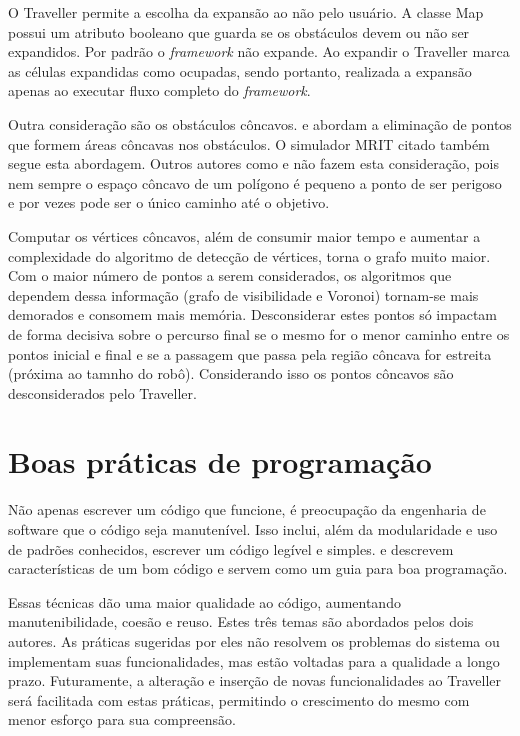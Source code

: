O Traveller permite a escolha da expansão ao não pelo usuário. A classe Map possui um atributo booleano que guarda se os obstáculos devem ou não ser expandidos. Por padrão o \textit{framework} não expande. Ao expandir o Traveller marca as células expandidas como ocupadas, sendo portanto, realizada a expansão apenas ao executar fluxo completo do \textit{framework}.

Outra consideração são os obstáculos côncavos. \cite{Siegwart2004} e \cite{Guzman2008} abordam a eliminação de pontos que formem áreas côncavas nos obstáculos. O simulador MRIT citado também segue esta abordagem. Outros autores como \cite{Thomsen2010} e \cite{Choset2005} não fazem esta consideração, pois nem sempre o espaço côncavo de um polígono é pequeno a ponto de ser perigoso e por vezes pode ser o único caminho até o objetivo. 

Computar os vértices côncavos, além de consumir maior tempo e aumentar a complexidade do algoritmo de detecção de vértices, torna o grafo muito maior. Com o maior número de pontos a serem considerados, os algoritmos que dependem dessa informação (grafo de visibilidade e Voronoi) tornam-se mais demorados e consomem mais memória. Desconsiderar estes pontos só impactam de forma decisiva sobre o percurso final se o mesmo for o menor caminho entre os pontos inicial e final e se a passagem que passa pela região côncava for estreita (próxima ao tamnho do robô). Considerando isso os pontos côncavos são desconsiderados pelo Traveller.

\section{Boas práticas de programação}

Não apenas escrever um código que funcione, é preocupação da engenharia de software que o código seja manutenível. Isso inclui, além da modularidade e uso de padrões conhecidos, escrever um código legível e simples. \cite{Goodliffe2007} e \cite{McConnel2004} descrevem características de um bom código e servem como um guia para boa programação.

Essas técnicas dão uma maior qualidade ao código, aumentando manutenibilidade, coesão e reuso. Estes três temas são abordados pelos dois autores. As práticas sugeridas por eles não resolvem os problemas do sistema ou implementam suas funcionalidades, mas estão voltadas para a qualidade a longo prazo. Futuramente, a alteração e inserção de novas funcionalidades ao Traveller será facilitada com estas práticas, permitindo o crescimento do mesmo com menor esforço para sua compreensão.

